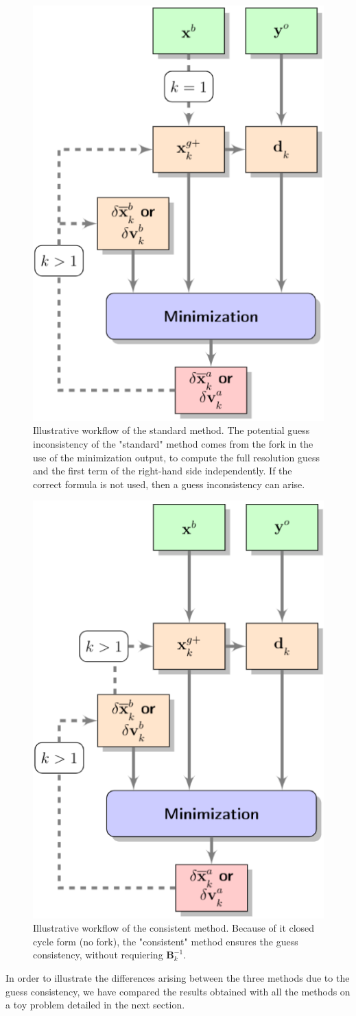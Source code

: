 \documentclass[npg, manuscript]{copernicus}
\begin{document}
\begin{figure}[H]
 \begin{center}
  \includegraphics[width=0.3\linewidth]{fig/std.png}
  \caption{\label{fig02} Illustrative workflow of the standard method. The potential guess inconsistency of the "standard" method comes from the fork in the use of the minimization output, to compute the full resolution guess and the first term of the right-hand side independently. If the correct formula is not used, then a guess inconsistency can arise.}
 \end{center}
\end{figure}

\begin{figure}[H]
 \begin{center}
  \includegraphics[width=0.3\linewidth]{fig/cst.png}
  \caption{\label{fig03} Illustrative workflow of the consistent method. Because of it closed cycle form (no fork), the "consistent" method ensures the guess consistency, without requiering $\mathbf{B}_k^{-1}$.}
 \end{center}
\end{figure}

In order to illustrate the differences arising between the three methods due to the guess consistency, we have compared the results obtained with all the methods on a toy problem detailed in the next section.

\end{document}
